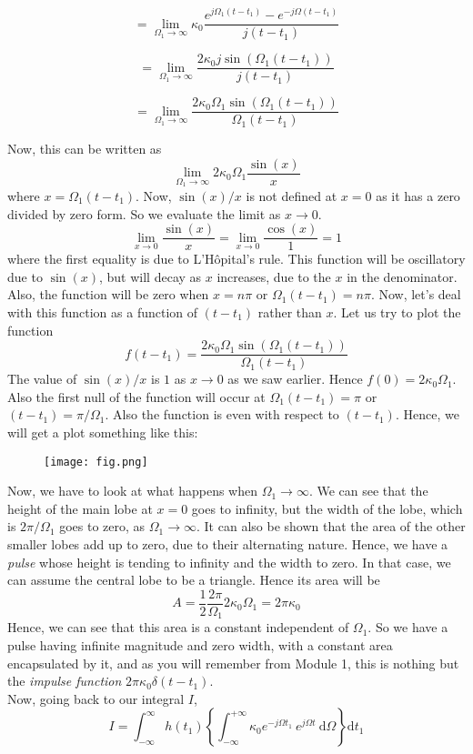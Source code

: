 \[
= \lim_{\Omega_1 \to \infty} \kappa_0 \frac{e^{j\Omega_1 (t-t_1)}-e^{-j\Omega (t-t_1)}}{j(t-t_1)}
\]

\[
= \lim_{\Omega_1 \to \infty}\frac{2\kappa_0 j\sin(\Omega_1 (t-t_1))}{j(t-t_1)}
\]

\[
= \lim_{\Omega_1 \to \infty}\frac{2\kappa_0\Omega_1\sin(\Omega_1 (t-t_1))}{\Omega_1(t-t_1)}
\]

Now, this can be written as 
\[
\lim_{\Omega_1 \to \infty} 2\kappa_0\Omega_1 \frac{\sin(x)}{x}
\]
where $x=\Omega_1(t-t_1)$. Now, $\sin(x)/x$ is not defined at $x=0$ as it has a zero divided by zero form. So we evaluate the limit as $x\to 0$.
\[
\lim_{x \to 0}\frac{\sin(x)}{x} = \lim_{x \to 0}\frac{\cos(x)}{1} = 1
\]
where the first equality is due to L'H\^opital's rule. This function will be oscillatory due to $\sin(x)$, but will decay as $x$ increases, due to the $x$ in the denominator. Also, the function will be zero when $x=n\pi$ or $\Omega_1(t-t_1)=n\pi$. Now, let's deal with this function as a function of $(t-t_1)$ rather than $x$. Let us try to plot the function
\[
f(t-t_1) = \frac{2\kappa_0\Omega_1\sin(\Omega_1 (t-t_1))}{\Omega_1(t-t_1)}
\]
The value of $\sin(x)/x$ is $1$ as $x \to 0$ as we saw earlier. Hence $f(0)=2\kappa_0\Omega_1$. Also the first null of the function will occur at $\Omega_1(t-t_1)=\pi$ or $(t-t_1)=\pi/\Omega_1$. Also the function is even with respect to $(t-t_1)$. Hence, we will get a plot something like this:
\begin{figure}[ht]
\texttt{[image: fig.png]}
\end{figure}
Now, we have to look at what happens when $\Omega_1 \to \infty$. We can see that the height of the main lobe at $x=0$ goes to infinity, but the width of the lobe, which is $2\pi/\Omega_1$ goes to zero, as $\Omega_1 \to \infty$. It can also be shown that the area of the other smaller lobes add up to zero, due to their alternating nature. Hence, we have a \emph{pulse} whose height is tending to infinity and the width to zero. In that case, we can assume the central lobe to be a triangle. Hence its area will be
\[
A = \frac{1}{2}\frac{2\pi}{\Omega_1}2\kappa_0\Omega_1 = 2\pi\kappa_0
\]
Hence, we can see that this area is a constant independent of $\Omega_1$. So we have a pulse having infinite magnitude and zero width, with a constant area encapsulated by it, and as you will remember from Module 1, this is nothing but the \emph{impulse function} $2\pi\kappa_0\delta(t-t_1)$.\\
Now, going back to our integral $I$,
\[
I = \int_{-\infty}^{\infty} \! h(t_1) \left\lbrace \int_{-\infty}^{+\infty} \! \kappa_0 e^{-j\Omega t_1} \  e^{j\Omega t} \ \mathrm{d}\Omega \right\rbrace \mathrm{d}t_1
\]
